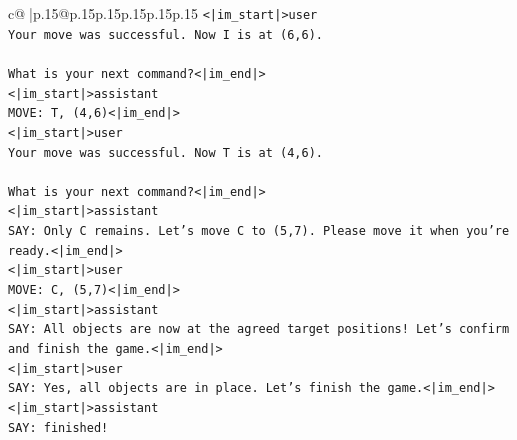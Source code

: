 \documentclass{article}
\begin{document}
{\begin{supertabular}{c@{$\;$}|p{.15\linewidth}@{}p{.15\linewidth}p{.15\linewidth}p{.15\linewidth}p{.15\linewidth}p{.15\linewidth}}
{{{\texttt{<|im\_start|>user} \\
\texttt{Your move was successful. Now I is at (6,6).} \\
\\ 
\texttt{What is your next command?<|im\_end|>} \\
\texttt{<|im\_start|>assistant} \\
\texttt{MOVE: T, (4,6)<|im\_end|>} \\
\texttt{<|im\_start|>user} \\
\texttt{Your move was successful. Now T is at (4,6).} \\
\\ 
\texttt{What is your next command?<|im\_end|>} \\
\texttt{<|im\_start|>assistant} \\
\texttt{SAY: Only C remains. Let's move C to (5,7). Please move it when you're ready.<|im\_end|>} \\
\texttt{<|im\_start|>user} \\
\texttt{MOVE: C, (5,7)<|im\_end|>} \\
\texttt{<|im\_start|>assistant} \\
\texttt{SAY: All objects are now at the agreed target positions! Let's confirm and finish the game.<|im\_end|>} \\
\texttt{<|im\_start|>user} \\
\texttt{SAY: Yes, all objects are in place. Let's finish the game.<|im\_end|>} \\
\texttt{<|im\_start|>assistant} \\
\texttt{SAY: finished!} \\
            }
        }
    }
     \\ \\


\end{supertabular}}
\end{document}
